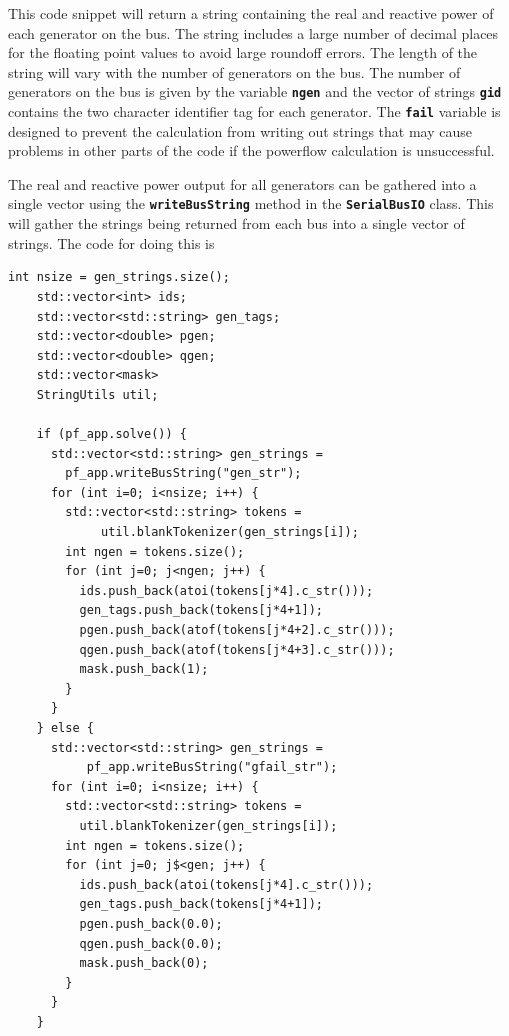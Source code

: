 \documentclass[12pt]{report} %
\begin{document}
This code snippet will return a string containing the real and reactive power of each generator on the bus. The string includes a large number of decimal places for the floating point values to avoid large roundoff errors. The length of the string will vary with the number of generators on the bus. The number of generators on the bus is given by the variable \texttt{\textbf{ngen}} and the vector of strings \texttt{\textbf{gid}} contains the two character identifier tag for each generator. The \texttt{\textbf{fail}} variable is designed to prevent the calculation from writing out strings that may cause problems in other parts of the code if the powerflow calculation is unsuccessful.

The real and reactive power output for all generators can be gathered into a single vector using the \texttt{\textbf{writeBusString}} method in the \texttt{\textbf{SerialBusIO}} class. This will gather the strings being returned from each bus into a single vector of strings. The code for doing this is

{
\color{red}
\begin{Verbatim}[fontseries=b]
    int nsize = gen_strings.size();
    std::vector<int> ids;
    std::vector<std::string> gen_tags;
    std::vector<double> pgen;
    std::vector<double> qgen;
    std::vector<mask>
    StringUtils util;

    if (pf_app.solve()) {
      std::vector<std::string> gen_strings =
        pf_app.writeBusString("gen_str");
      for (int i=0; i<nsize; i++) {
        std::vector<std::string> tokens =
             util.blankTokenizer(gen_strings[i]);
        int ngen = tokens.size();
        for (int j=0; j<ngen; j++) {
          ids.push_back(atoi(tokens[j*4].c_str()));
          gen_tags.push_back(tokens[j*4+1]);
          pgen.push_back(atof(tokens[j*4+2].c_str()));
          qgen.push_back(atof(tokens[j*4+3].c_str()));
          mask.push_back(1);
        }
      }
    } else {
      std::vector<std::string> gen_strings =
           pf_app.writeBusString("gfail_str");
      for (int i=0; i<nsize; i++) {
        std::vector<std::string> tokens =
          util.blankTokenizer(gen_strings[i]);
        int ngen = tokens.size();
        for (int j=0; j$<gen; j++) {
          ids.push_back(atoi(tokens[j*4].c_str()));
          gen_tags.push_back(tokens[j*4+1]);
          pgen.push_back(0.0);
          qgen.push_back(0.0);
          mask.push_back(0);
        }
      }
    }
\end{Verbatim}
}
\end{document}
